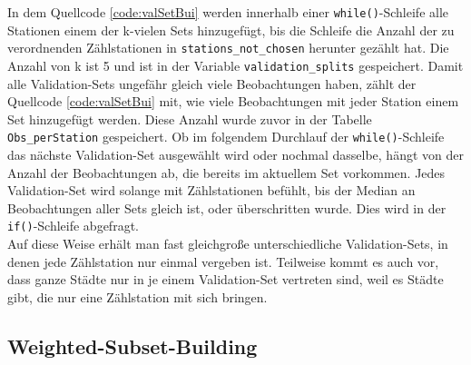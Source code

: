 \documentclass[a4paper,12pt]{thesis}
\begin{document}
In dem Quellcode \ref{code:valSetBui} werden innerhalb einer \lstinline|while()|-Schleife alle Stationen einem der k-vielen Sets hinzugefügt, bis die Schleife die Anzahl der zu verordnenden Zählstationen in \lstinline|stations_not_chosen| herunter gezählt hat. Die Anzahl von k ist 5 und ist in der Variable \lstinline|validation_splits| gespeichert. Damit alle Validation-Sets ungefähr gleich viele Beobachtungen haben, zählt der Quellcode \ref{code:valSetBui} mit, wie viele Beobachtungen mit jeder Station einem Set hinzugefügt werden. Diese Anzahl wurde zuvor in der Tabelle \lstinline|Obs_perStation| gespeichert. Ob im folgendem Durchlauf der \lstinline|while()|-Schleife das nächste Validation-Set ausgewählt wird oder nochmal dasselbe, hängt von der Anzahl der Beobachtungen ab, die bereits im aktuellem Set vorkommen. Jedes Validation-Set wird solange mit Zählstationen befühlt, bis der Median an Beobachtungen aller Sets gleich ist, oder überschritten wurde. Dies wird in der \lstinline|if()|-Schleife abgefragt.\\
Auf diese Weise erhält man fast gleichgroße unterschiedliche Validation-Sets, in denen jede Zählstation nur einmal vergeben ist. Teilweise kommt es auch vor, dass ganze Städte nur in je einem Validation-Set vertreten sind, weil es Städte gibt, die nur eine Zählstation mit sich bringen.

\subsection{Weighted-Subset-Building}
\end{document}
